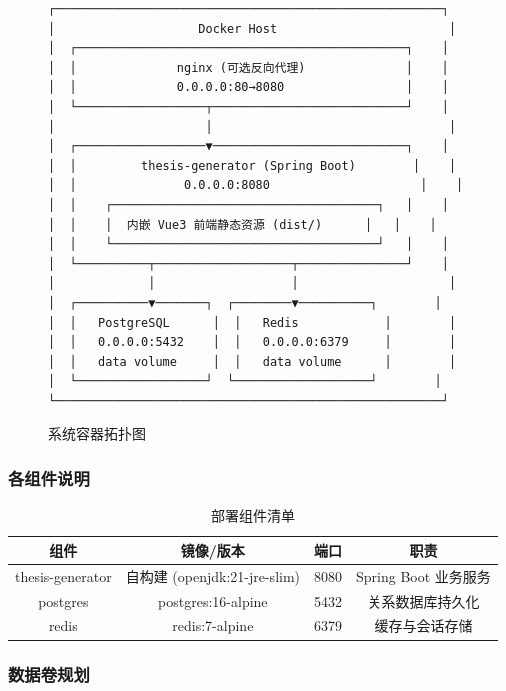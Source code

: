 \documentclass{../softeng}
\begin{document}
\begin{figure}[htbp]
\centering
\begin{verbatim}
┌──────────────────────────────────────────────────────┐
│                    Docker Host                        │
│  ┌──────────────────────────────────────────────┐    │
│  │              nginx (可选反向代理)              │    │
│  │              0.0.0.0:80→8080                 │    │
│  └──────────────────┬───────────────────────────┘    │
│                     │                                 │
│  ┌──────────────────▼───────────────────────────┐    │
│  │         thesis-generator (Spring Boot)        │    │
│  │               0.0.0.0:8080                     │    │
│  │    ┌─────────────────────────────────────┐   │    │
│  │    │  内嵌 Vue3 前端静态资源 (dist/)      │   │    │
│  │    └─────────────────────────────────────┘   │    │
│  └──────────┬───────────────────┬───────────────┘    │
│             │                   │                     │
│  ┌──────────▼───────┐  ┌────────▼──────────┐        │
│  │   PostgreSQL      │  │   Redis            │        │
│  │   0.0.0.0:5432    │  │   0.0.0.0:6379     │        │
│  │   data volume     │  │   data volume      │        │
│  └──────────────────┘  └───────────────────┘        │
└──────────────────────────────────────────────────────┘
\end{verbatim}
\caption{系统容器拓扑图}
\label{fig:deploy-topology}
\end{figure}

\subsubsection{各组件说明}

\begin{table}[htbp]
\centering
\caption{部署组件清单}
\label{tab:deploy-components}
\begin{tabular}{|c|c|c|c|}
\hline
\textbf{组件} & \textbf{镜像/版本} & \textbf{端口} & \textbf{职责} \\
\hline
thesis-generator & 自构建 (openjdk:21-jre-slim) & 8080 & Spring Boot 业务服务 \\
\hline
postgres & postgres:16-alpine & 5432 & 关系数据库持久化 \\
\hline
redis & redis:7-alpine & 6379 & 缓存与会话存储 \\
\hline
\end{tabular}
\end{table}

\subsubsection{数据卷规划}
\end{document}
